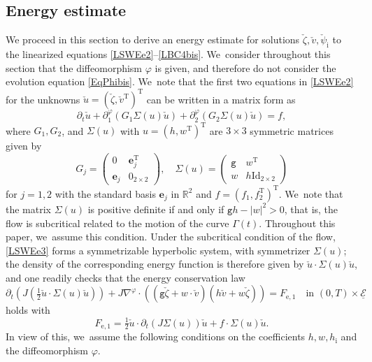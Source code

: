 \documentclass[JEP,XML,SOM,Unicode,NoFloatCountersInSection,published]{cedram}
\newcommand{\gr}{{\mathtt g}}
\newcommand{\R}{{\mathbb R}}
\newcommand{\dt}{\partial_t}
\newcommand{\cE}{{\mathcal E}}
\newcommand{\ul}[1]{\underline{#1}}
\newcommand{\itGamma}{\mathit{\Gamma}}
\theoremstyle{definition}
\begin{document}
\subsection{Energy estimate}
We proceed in this section to derive an energy estimate for solutions $\check{\zeta},\check{v},\check{\psi}_\mathrm{i}$ to the linearized equations
\eqref{LSWEe2}--\eqref{LBC4bis}. We~consider throughout this section that the diffeomorphism $\varphi$ is given, and therefore do not consider the evolution equation \eqref{EqPhibis}. We~note that the first two equations in \eqref{LSWEe2} for the unknowns $\check{u}=(\check{\zeta},\check{v}^\mathrm{T})^\mathrm{T}$
can be written in a matrix form as
\begin{equation}\label{LSWEe3}
\dt\check{u}+\partial_1^\varphi(G_1\Sigma(u)\check{u})+\partial_2^\varphi(G_2\Sigma(u)\check{u})=f,
\end{equation}
where $G_1,G_2$, and $\Sigma(u)$ with $u=(h,w^\mathrm{T})^\mathrm{T}$ are $3\times3$ symmetric matrices given by
\[
G_j=
\begin{pmatrix}
0 & \mathbf{e}_j^\mathrm{T} \\
\mathbf{e}_j & 0_{2\times2}
\end{pmatrix}, \quad
\Sigma(u)=
\begin{pmatrix}
\gr & w^\mathrm{T} \\
w & h\mathrm{Id}_{2\times2}
\end{pmatrix}
\]
for $j=1,2$ with the standard basis $\mathbf{e}_j$ in $\R^2$ and $f=(f_1,f_2^\mathrm{T})^\mathrm{T}$. We~note that the matrix $\Sigma(u)$ is positive definite if and only if $\gr h-|w|^2>0$, that is,
the flow is subcritical related to the motion of the curve $\itGamma(t)$.
Throughout this paper, we~assume this condition.
Under the subcritical condition of the flow, \eqref{LSWEe3} forms a symmetrizable hyperbolic system, with symmetrizer $\Sigma(u)$;
the density of the corresponding energy function is therefore given by $\check{u}\cdot\Sigma(u)\check{u}$,
and one readily checks that the energy conservation law
\begin{equation}\label{localCE}
\dt(J(\tfrac12\check{u}\cdot\Sigma(u)\check{u}))
+ J\nabla^\varphi\cdot((\gr\check{\zeta}+w\cdot\check{v})(h\check{v}+w\check{\zeta})) = F_\mathrm{e,1}
\quad\text{in } (0,T)\times\ul{\cE}
\end{equation}
holds with
\[
F_\mathrm{e,1}=\tfrac{1}{2}\check{u}\cdot\dt (J\Sigma(u))\check{u} + f\cdot \Sigma(u)\check{u}.
\]
In view of this, we~assume the following conditions on the coefficients $h,w,h_\mathrm{i}$ and the diffeomorphism $\varphi$.
\end{document}

